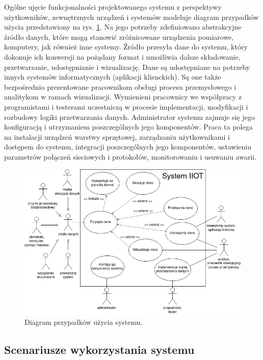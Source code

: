 \documentclass[a4paper, 12pt, twoside]{article}
\begin{document}
Ogólne ujęcie funkcjonalności projektowanego systemu z perspektywy użytkowników,
zewnętrznych urządzeń i systemów modeluje diagram przypadków użycia przedstawiony
na rys. \ref{fig:use-case}. Na jego potrzeby zdefiniowano abstrakcyjne
źródło danych, które mogą stanowić zróżnicowane urządzenia pomiarowe, komputery,
jak również inne systemy. Źródło przesyła
dane do systemu, który dokonuje ich konwersji na pożądany format i umożliwia
dalsze składowanie, przetwarzanie, udostępnianie i wizualizację. Dane są
udostępniane na potrzeby innych systemów informatycznych (aplikacji klienckich).
Są one także bezpośrednio prezentowane pracownikom obsługi procesu przemysłowego
i analitykom w ramach wizualizacji. Wymienieni pracownicy we
współpracy z programistami i testerami uczestniczą
w procesie implementacji, modyfikacji i rozbudowy logiki przetwarzania danych.
Administrator systemu zajmuje się jego konfiguracją i utrzymaniem
poszczególnych jego komponentów. Praca ta polega na
instalacji urządzeń warstwy sprzętowej, zarządzaniu
użytkownikami i dostępem do systemu, integracji poszczególnych jego komponentów,
ustawieniu parametrów połączeń sieciowych i protokołów, monitorowaniu
i usuwaniu awarii.

\begin{figure}
      \centering
      \includegraphics[width=\textwidth]{use-case.png}
      \caption{Diagram przypadków użycia systemu.}
      \label{fig:use-case}
\end{figure}

\subsection{Scenariusze wykorzystania systemu}\label{scenariusze}
\end{document}
